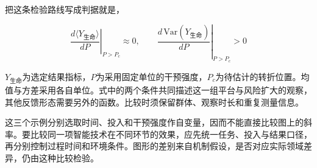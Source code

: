 把这条检验路线写成判据就是，

\begin{equation}
\left.\frac{d\langle Y_{\text{生命}}\rangle}{dP}\right|_{P>P_{c}}\approx0,\qquad \left.\frac{d\,\mathrm{Var}(Y_{\text{生命}})}{dP}\right|_{P>P_{c}}>0
\end{equation}

$Y_{\text{生命}}$为选定结果指标，$P$为采用固定单位的干预强度，$P_c$为待估计的转折位置。均值与方差采用各自单位。式中的两个条件共同描述这一组平台与风险扩大的观察，其他反馈形态需要另外的函数。比较时须保留群体、观察时长和重复测量信息。

这三个示例分别选取时间、投入和干预强度作自变量，因而不能直接比较图上的斜率。要比较同一项智能技术在不同环节的效果，应先统一任务、投入与结果口径，再分别控制过程时间和环境条件。图形的差别来自机制假设，是否对应实际领域差异，仍由这种比较检验。

